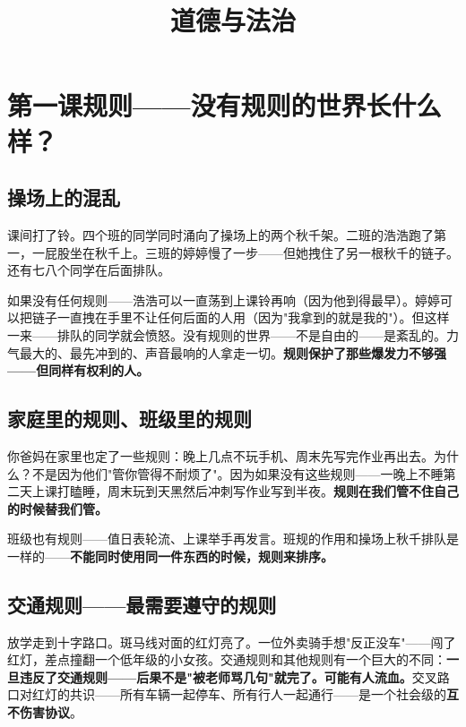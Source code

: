 \documentclass[a4paper,12pt]{ctexart}
\title{\textcolor{blue!70!black}{\Huge\textbf{道德与法治}}}
\author{}
\date{}
\begin{document}
\maketitle
\thispagestyle{empty}

\tableofcontents
\newpage

\section{\textcolor{orange!80!black}{第一课\quad 规则——没有规则的世界长什么样？}}

\subsection*{操场上的混乱}

课间打了铃。四个班的同学同时涌向了操场上的两个秋千架。二班的浩浩跑了第一，一屁股坐在秋千上。三班的婷婷慢了一步——但她拽住了另一根秋千的链子。还有七八个同学在后面排队。

如果没有任何规则——浩浩可以一直荡到上课铃再响（因为他到得最早）。婷婷可以把链子一直拽在手里不让任何后面的人用（因为"我拿到的就是我的"）。但这样一来——排队的同学就会愤怒。没有规则的世界——不是自由的——是紊乱的。力气最大的、最先冲到的、声音最响的人拿走一切。\textbf{规则保护了那些爆发力不够强——但同样有权利的人。}

\subsection*{家庭里的规则、班级里的规则}

你爸妈在家里也定了一些规则：晚上几点不玩手机、周末先写完作业再出去。为什么？不是因为他们"管你管得不耐烦了"。因为如果没有这些规则——一晚上不睡第二天上课打瞌睡，周末玩到天黑然后冲刺写作业写到半夜。\textbf{规则在我们管不住自己的时候替我们管。}

班级也有规则——值日表轮流、上课举手再发言。班规的作用和操场上秋千排队是一样的——\textbf{不能同时使用同一件东西的时候，规则来排序。}

\subsection*{交通规则——最需要遵守的规则}

放学走到十字路口。斑马线对面的红灯亮了。一位外卖骑手想"反正没车"——闯了红灯，差点撞翻一个低年级的小女孩。交通规则和其他规则有一个巨大的不同：\textbf{一旦违反了交通规则——后果不是"被老师骂几句"就完了。可能有人流血。}交叉路口对红灯的共识——所有车辆一起停车、所有行人一起通行——是一个社会级的\textbf{互不伤害协议}。
\end{document}
